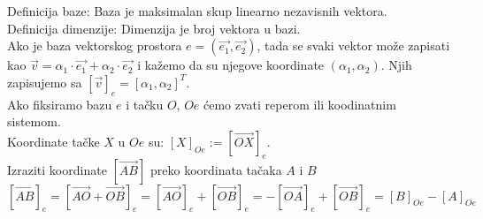 \documentclass[12pt]{article}
\newcommand{\vek}[1]{\overrightarrow{#1}}
\begin{document}
\vspace*{1cm}

Definicija baze: Baza je maksimalan skup linearno nezavisnih vektora.\\
Definicija dimenzije: Dimenzija je broj vektora u bazi.\\
Ako je baza vektorskog prostora $e=(\vek{e_1}, \vek{e_2})$,
tada se svaki vektor može zapisati kao $\vek{v}=\alpha_1\cdot\vek{e_1}+\alpha_2\cdot\vek{e_2}$
i kažemo da su njegove koordinate $(\alpha_1, \alpha_2)$. Njih zapisujemo
sa $[\vek{v}]_e=[\alpha_1, \alpha_2]^T$.\\
Ako fiksiramo bazu $e$ i tačku $O$, $Oe$ ćemo zvati reperom ili
koodinatnim sistemom.\\
Koordinate tačke $X$ u $Oe$ su: $[X]_{Oe}:=[\vek{OX}]_e$.\\
Izraziti koordinate $[\vek{AB}]$ preko koordinata tačaka $A$ i $B$
$$[\vek{AB}]_e=[\vek{AO}+\vek{OB}]_e=[\vek{AO}]_e+[\vek{OB}]_e=-[\vek{OA}]_e+[\vek{OB}]_e=[B]_{Oe}-[A]_{Oe}$$
\end{document}
